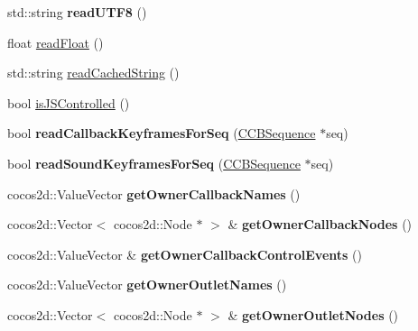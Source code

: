 \begin{DoxyCompactItemize}
std\+::string {\bfseries read\+U\+T\+F8} ()
\item 
float \hyperlink{classcocosbuilder_1_1CCBReader_a6e205e174b2173124e27a8ef19ca283d}{read\+Float} ()
\item 
std\+::string \hyperlink{classcocosbuilder_1_1CCBReader_a076e51bafdbf461ecec8a5ccdcc496ab}{read\+Cached\+String} ()
\item 
bool \hyperlink{classcocosbuilder_1_1CCBReader_a85bbde9fd4b13809ac5b1cd259ea2145}{is\+J\+S\+Controlled} ()
\item 
\mbox{\label{classcocosbuilder_1_1CCBReader_a3616ec613bf56919777fe31214c5d5f1}} 
bool {\bfseries read\+Callback\+Keyframes\+For\+Seq} (\hyperlink{classcocosbuilder_1_1CCBSequence}{C\+C\+B\+Sequence} $\ast$seq)
\item 
\mbox{\label{classcocosbuilder_1_1CCBReader_a06d19bf2c9f55e9a73afdf2d0f2a2ee2}} 
bool {\bfseries read\+Sound\+Keyframes\+For\+Seq} (\hyperlink{classcocosbuilder_1_1CCBSequence}{C\+C\+B\+Sequence} $\ast$seq)
\item 
\mbox{\label{classcocosbuilder_1_1CCBReader_a6cfd28c3dbf1e66419c3ac3aa35cc6d7}} 
cocos2d\+::\+Value\+Vector {\bfseries get\+Owner\+Callback\+Names} ()
\item 
\mbox{\label{classcocosbuilder_1_1CCBReader_a498d0bd8521639a6a7e9bb77020a95e6}} 
cocos2d\+::\+Vector$<$ cocos2d\+::\+Node $\ast$ $>$ \& {\bfseries get\+Owner\+Callback\+Nodes} ()
\item 
\mbox{\label{classcocosbuilder_1_1CCBReader_ad3a9e9e5ac9e6bf93a66e0eef8b89674}} 
cocos2d\+::\+Value\+Vector \& {\bfseries get\+Owner\+Callback\+Control\+Events} ()
\item 
\mbox{\label{classcocosbuilder_1_1CCBReader_a4a1678737eac5b03c52f78d482dd6084}} 
cocos2d\+::\+Value\+Vector {\bfseries get\+Owner\+Outlet\+Names} ()
\item 
\mbox{\label{classcocosbuilder_1_1CCBReader_acc15923838219d283903a115ce04f83e}} 
cocos2d\+::\+Vector$<$ cocos2d\+::\+Node $\ast$ $>$ \& {\bfseries get\+Owner\+Outlet\+Nodes} ()

\end{DoxyCompactItemize}
